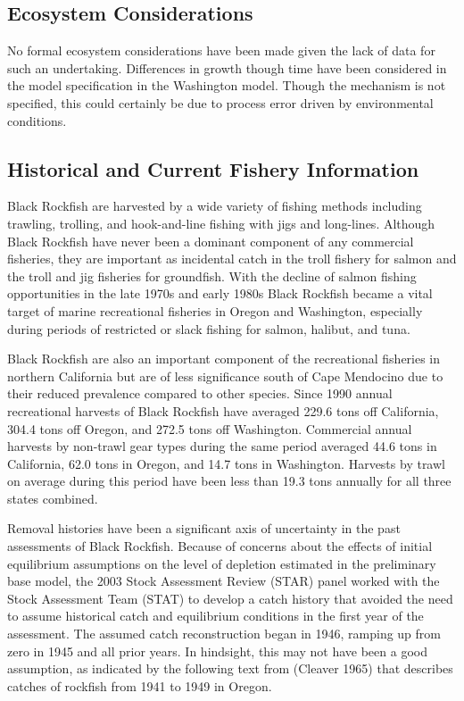 \documentclass[11pt,
  english,
  letterpaper,
]{article}
\begin{document}
\hypertarget{ecosystem-considerations-1}{%
\subsection{Ecosystem Considerations}\label{ecosystem-considerations-1}}

No formal ecosystem considerations have been made given the lack of data for such an undertaking. Differences in growth though time have been considered in the model specification in the Washington model. Though the mechanism is not specified, this could certainly be due to process error driven by environmental conditions.

\hypertarget{historical-and-current-fishery-information}{%
\subsection{Historical and Current Fishery Information}\label{historical-and-current-fishery-information}}

Black Rockfish are harvested by a wide variety of fishing methods including trawling, trolling, and hook-and-line fishing with jigs and long-lines. Although Black Rockfish have never been a dominant component of any commercial fisheries, they are important as incidental catch in the troll fishery for salmon and the troll and jig fisheries for groundfish. With the decline of salmon fishing opportunities in the late 1970s and early 1980s Black Rockfish became a vital target of marine recreational fisheries in Oregon and Washington, especially during periods of restricted or slack fishing for salmon, halibut, and tuna.

Black Rockfish are also an important component of the recreational fisheries in northern California but are of less significance south of Cape Mendocino due to their reduced prevalence compared to other species. Since 1990 annual recreational harvests of Black Rockfish have averaged 229.6 tons off California, 304.4 tons off Oregon, and 272.5 tons off Washington. Commercial annual harvests by non-trawl gear types during the same period averaged 44.6 tons in California, 62.0 tons in Oregon, and 14.7 tons in Washington. Harvests by trawl on average during this period have been less than 19.3 tons annually for all three states combined.

Removal histories have been a significant axis of uncertainty in the past assessments of Black Rockfish. Because of concerns about the effects of initial equilibrium assumptions on the level of depletion estimated in the preliminary base model, the 2003 Stock Assessment Review (STAR) panel worked with the Stock Assessment Team (STAT) to develop a catch history that avoided the need to assume historical catch and equilibrium conditions in the first year of the assessment. The assumed catch reconstruction began in 1946, ramping up from zero in 1945 and all prior years. In hindsight, this may not have been a good assumption, as indicated by the following text from (Cleaver 1965) that describes catches of rockfish from 1941 to 1949 in Oregon.
\end{document}
